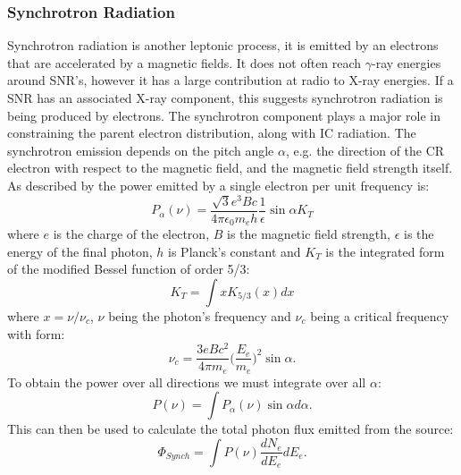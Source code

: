 \documentclass[12pt,a4paper]{article}
\begin{document}
\subsubsection{Synchrotron Radiation}
Synchrotron radiation is another leptonic process, it is emitted by an electrons that are accelerated by a magnetic fields. It does not often reach $\gamma$-ray energies around SNR's, however it has a large contribution at radio to X-ray energies. If a SNR has an associated X-ray component, this suggests synchrotron radiation is being produced by electrons. The synchrotron component plays a major role in constraining the parent electron distribution, along with IC radiation. The synchrotron emission depends on the pitch angle $\alpha$, e.g. the direction of the CR electron with respect to the magnetic field, and the magnetic field strength itself. As described by \cite{2010A&A...523A...2M, 1970RvMP...42..237B,2007A&A...474..689M} the power emitted by a single electron per unit frequency is:
\begin{equation} \label{eq:14}
P_{\alpha}(\nu) = \dfrac{\sqrt{3} e^3 B c}{4 \pi \epsilon_0 m_e h} \dfrac{1}{\epsilon} \sin{\alpha} K_T 
\end{equation}
where $e$ is the charge of the electron, $B$ is the magnetic field strength,  $\epsilon$ is the energy of the final photon, $h$ is Planck's constant and $K_T$ is the integrated form of the modified Bessel function of order 5/3:
\begin{equation} \label{eq:15}
K_T = \int x K_{5/3}(x)dx
\end{equation}
where $x = \nu/\nu_c$, $\nu$ being the photon's frequency and $\nu_c$ being a critical frequency with form:
\begin{equation} \label{eq:16}
\nu_c = \dfrac{3eBc^2}{4\pi m_e} \bigg(\dfrac{E_e}{m_e}\bigg)^2 \sin{\alpha}.
\end{equation}
To obtain the power over all directions we must integrate over all $\alpha$:
\begin{equation} \label{eq:17}
P(\nu) = \int P_{\alpha}(\nu) \sin{\alpha} d\alpha.
\end{equation}
This can then be used to calculate the total photon flux emitted from the source:
\begin{equation} \label{eq:18}
\Phi_{Synch} = \int P(\nu) \dfrac{dN_e}{dE_e} dE_e.
\end{equation}\\
\end{document}
